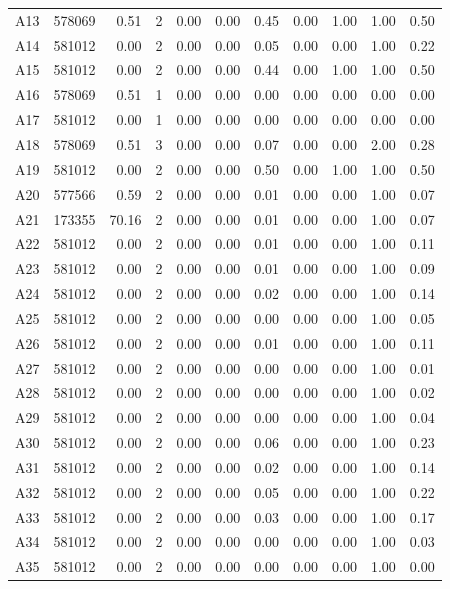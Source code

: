 \documentclass[11pt]{report}
\begin{document}
\begin{table}[H]
{\begin{tabular}{lrrrrrrrrrr}
A13 & 578069 & 0.51 & 2 & 0.00 & 0.00 & 0.45 & 0.00 & 1.00 & 1.00 & 0.50 \\
A14 & 581012 & 0.00 & 2 & 0.00 & 0.00 & 0.05 & 0.00 & 0.00 & 1.00 & 0.22 \\
A15 & 581012 & 0.00 & 2 & 0.00 & 0.00 & 0.44 & 0.00 & 1.00 & 1.00 & 0.50 \\
A16 & 578069 & 0.51 & 1 & 0.00 & 0.00 & 0.00 & 0.00 & 0.00 & 0.00 & 0.00 \\
A17 & 581012 & 0.00 & 1 & 0.00 & 0.00 & 0.00 & 0.00 & 0.00 & 0.00 & 0.00 \\
A18 & 578069 & 0.51 & 3 & 0.00 & 0.00 & 0.07 & 0.00 & 0.00 & 2.00 & 0.28 \\
A19 & 581012 & 0.00 & 2 & 0.00 & 0.00 & 0.50 & 0.00 & 1.00 & 1.00 & 0.50 \\
A20 & 577566 & 0.59 & 2 & 0.00 & 0.00 & 0.01 & 0.00 & 0.00 & 1.00 & 0.07 \\
A21 & 173355 & 70.16 & 2 & 0.00 & 0.00 & 0.01 & 0.00 & 0.00 & 1.00 & 0.07 \\
A22 & 581012 & 0.00 & 2 & 0.00 & 0.00 & 0.01 & 0.00 & 0.00 & 1.00 & 0.11 \\
A23 & 581012 & 0.00 & 2 & 0.00 & 0.00 & 0.01 & 0.00 & 0.00 & 1.00 & 0.09 \\
A24 & 581012 & 0.00 & 2 & 0.00 & 0.00 & 0.02 & 0.00 & 0.00 & 1.00 & 0.14 \\
A25 & 581012 & 0.00 & 2 & 0.00 & 0.00 & 0.00 & 0.00 & 0.00 & 1.00 & 0.05 \\
A26 & 581012 & 0.00 & 2 & 0.00 & 0.00 & 0.01 & 0.00 & 0.00 & 1.00 & 0.11 \\
A27 & 581012 & 0.00 & 2 & 0.00 & 0.00 & 0.00 & 0.00 & 0.00 & 1.00 & 0.01 \\
A28 & 581012 & 0.00 & 2 & 0.00 & 0.00 & 0.00 & 0.00 & 0.00 & 1.00 & 0.02 \\
A29 & 581012 & 0.00 & 2 & 0.00 & 0.00 & 0.00 & 0.00 & 0.00 & 1.00 & 0.04 \\
A30 & 581012 & 0.00 & 2 & 0.00 & 0.00 & 0.06 & 0.00 & 0.00 & 1.00 & 0.23 \\
A31 & 581012 & 0.00 & 2 & 0.00 & 0.00 & 0.02 & 0.00 & 0.00 & 1.00 & 0.14 \\
A32 & 581012 & 0.00 & 2 & 0.00 & 0.00 & 0.05 & 0.00 & 0.00 & 1.00 & 0.22 \\
A33 & 581012 & 0.00 & 2 & 0.00 & 0.00 & 0.03 & 0.00 & 0.00 & 1.00 & 0.17 \\
A34 & 581012 & 0.00 & 2 & 0.00 & 0.00 & 0.00 & 0.00 & 0.00 & 1.00 & 0.03 \\
A35 & 581012 & 0.00 & 2 & 0.00 & 0.00 & 0.00 & 0.00 & 0.00 & 1.00 & 0.00 \\

\end{tabular}}
\end{table}
\end{document}
